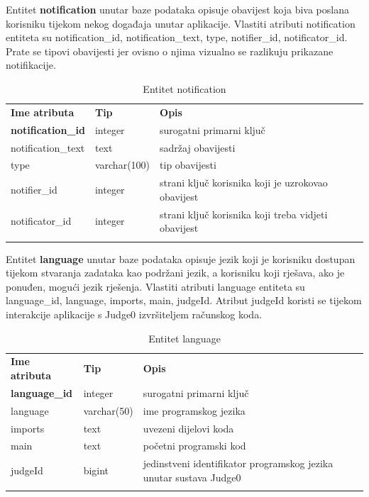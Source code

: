 \documentclass[times, utf8, zavrsni]{fer}
\begin{document}
		Entitet \textbf{notification} unutar baze podataka opisuje obavijest koja biva poslana korisniku tijekom nekog događaja unutar aplikacije. Vlastiti atributi notification entiteta su notification\_id, notification\_text, type, notifier\_id, notificator\_id. Prate se tipovi obavijesti jer ovisno o njima vizualno se razlikuju prikazane notifikacije.
		\begin{table}[H]
			\caption{Entitet notification}
			\label{tbl:notification}
			\centering
			\begin{tabu} to \textwidth {XXX}
				\tabucline[1.75pt]{-}
				\textbf{Ime atributa} & \textbf{Tip} & \textbf{Opis}\\ 				
				\tabucline[1.75pt]{-}
				\textbf{notification\_id} & integer & surogatni primarni ključ\\ \hline
				notification\_text & text & sadržaj obavijesti\\ \hline
				type & varchar(100) & tip obavijesti\\ \hline
				notifier\_id & integer & strani ključ korisnika koji je uzrokovao obavijest\\ \hline
				notificator\_id & integer & strani ključ korisnika koji treba vidjeti obavijest\\ \hline
				\tabucline[1.75pt]{-}
			\end{tabu}
		\end{table}
	
		Entitet \textbf{language} unutar baze podataka opisuje jezik koji je korisniku dostupan tijekom stvaranja zadataka kao podržani jezik, a korisniku koji rješava, ako je ponuđen, mogući jezik rješenja. Vlastiti atributi language entiteta su language\_id, language, imports, main, judgeId. Atribut judgeId koristi se tijekom interakcije aplikacije s Judge0 izvršiteljem računskog koda. 
		\begin{table}[H]
			\caption{Entitet language}
			\label{tbl:language}
			\centering
			\begin{tabu} to \textwidth {XXX}
				\tabucline[1.75pt]{-}
				\textbf{Ime atributa} & \textbf{Tip} & \textbf{Opis}\\ 				
				\tabucline[1.75pt]{-}
				\textbf{language\_id} & integer & surogatni primarni ključ\\ \hline
				language & varchar(50) & ime programskog jezika\\ \hline
				imports & text & uvezeni dijelovi koda\\ \hline
				main & text & početni programski kod\\ \hline
				judgeId & bigint & jedinstveni identifikator programskog jezika unutar sustava Judge0\\ \hline
				\tabucline[1.75pt]{-}
			\end{tabu}
		\end{table}
	
\end{document}
